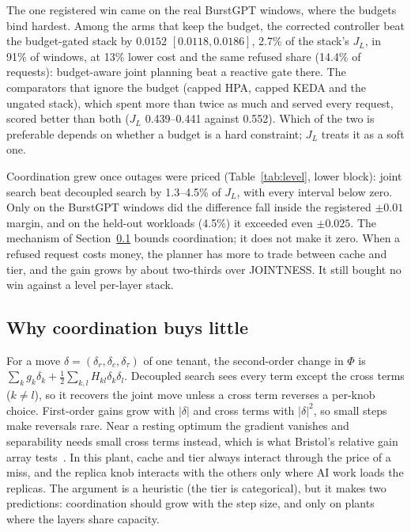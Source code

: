 The one registered win came on the real BurstGPT windows, where the budgets
bind hardest. Among the arms that keep the budget, the corrected controller
beat the budget-gated stack by $0.0152$ $[0.0118,0.0186]$, 2.7\% of the stack's
$J_L$, in 91\% of windows, at 13\% lower cost and the same refused share (14.4\%
of requests): budget-aware joint planning beat a reactive gate there. The
comparators that ignore the budget (capped HPA, capped KEDA and the ungated
stack), which spent more than twice as much and served every request, scored
better than both ($J_L$ 0.439--0.441 against 0.552). Which of the two is
preferable depends on whether a budget is a hard constraint; $J_L$ treats it
as a soft one.

Coordination grew once outages were priced (Table~\ref{tab:level}, lower
block): joint search beat decoupled search by 1.3--4.5\% of $J_L$, with every
interval below zero. Only on the BurstGPT windows did the difference fall
inside the registered $\pm0.01$ margin, and on the held-out workloads (4.5\%) it
exceeded even $\pm0.025$. The mechanism of Section~\ref{sec:width} bounds
coordination; it does not make it zero. When a refused request costs money,
the planner has more to trade between cache and tier, and the gain grows by
about two-thirds over JOINTNESS. It still bought no win against a level
per-layer stack.

\subsection{Why coordination buys little}
\label{sec:width}

For a move $\delta=(\delta_r,\delta_c,\delta_\tau)$ of one tenant, the
second-order change in $\Phi$ is
$\sum_k g_k\delta_k+\frac12\sum_{k,l}H_{kl}\delta_k\delta_l$. Decoupled
search sees every term except the cross terms ($k\neq l$), so it recovers the
joint move unless a cross term reverses a per-knob choice. First-order gains
grow with $|\delta|$ and cross terms with $|\delta|^2$, so small steps make
reversals rare. Near a resting optimum the gradient vanishes and
separability needs small cross terms instead, which is what Bristol's
relative gain array tests~\cite{bristol1966}. In this plant, cache and tier
always interact through the price of a miss, and the replica knob interacts
with the others only where AI work loads the replicas. The argument is a
heuristic (the tier is categorical), but it makes two predictions:
coordination should grow with the step size, and only on plants where the
layers share capacity.

